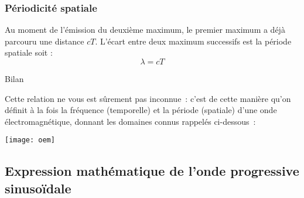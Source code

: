 \documentclass[../main/main.tex]{subfiles}
\begin{document}
\subsubsection{Périodicité spatiale}

Au moment de l’émission du deuxième maximum, le premier maximum a déjà parcouru
une distance $cT$. L’écart entre deux maximum successifs est la période spatiale
soit :
\[\lambda = cT\]

\begin{bprop}{Bilan}
\end{bprop}

Cette relation ne vous est sûrement pas inconnue~: c'est de cette manière qu'on
définit à la fois la fréquence (temporelle) et la période (spatiale) d'une onde
électromagnétique, donnant les domaines connus rappelés ci-dessous~:

\begin{center}
    \texttt{[image: oem]}
\end{center}

\subsection{Expression mathématique de l'onde progressive sinusoïdale}
\end{document}
